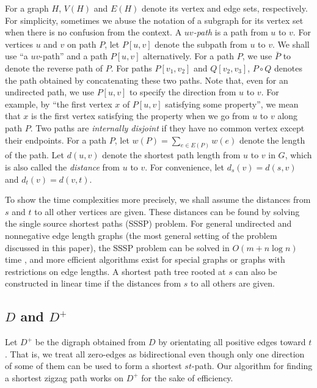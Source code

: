 \documentclass[review]{elsarticle}
\begin{document}
For a graph $H$, $V(H)$ and $E(H)$ denote its vertex and edge sets,
respectively. For simplicity, sometimes we abuse the notation of a
subgraph for its vertex set when there is no confusion from the
context. A {\em $uv$-path} is a path from $u$ to $v$. For vertices
$u$ and $v$ on path $P$, let $P[u,v]$ denote the subpath from $u$ to
$v$. We shall use ``a $uv$-path'' and a path $P[u,v]$ alternatively.
For a path $P$, we use $\bar{P}$ to denote the reverse path of $P$.
For paths $P[v_1,v_2]$ and $Q[v_2,v_3]$, $P\circ Q$ denotes the path
obtained by concatenating these two paths. Note that, even for an
undirected path, we use $P[u,v]$ to specify the direction from $u$
to $v$. For example, by ``the first vertex $x$ of $P[u,v]$
satisfying some property'', we mean that $x$ is the first vertex
satisfying the property when we go from $u$ to $v$ along path $P$.
Two paths are {\em internally disjoint} if they have no common
vertex except their endpoints. For a path $P$, let $w(P)=\sum_{e\in
E(P)}w(e)$ denote the length of the path. Let $d(u,v)$ denote the
shortest path length from $u$ to $v$ in $G$, which is also called
the {\em distance} from $u$ to $v$. For convenience, let
$d_s(v)=d(s,v)$ and $d_t(v)=d(v,t)$.


To show the time complexities more precisely, we shall assume the
distances from $s$ and $t$ to all other vertices are given. These
distances can be found by solving the single source shortest paths
(SSSP) problem. For general undirected and nonnegative edge length
graphs (the most general setting of the problem discussed in this
paper), the SSSP problem can be solved in $O(m+n\log n)$ time
\cite{cor01,fred87}, and more efficient algorithms exist for special
graphs or graphs with restrictions on edge lengths. A shortest path
tree rooted at $s$ can also be constructed in linear time if the
distances from $s$ to all others are given.

\subsection{$D$ and $D^+$}

Let $D^+$ be the digraph obtained from $D$ by orientating all
positive edges toward $t$. That is, we treat all zero-edges as
bidirectional even though only one direction of some of them can be
used to form a shortest $st$-path. Our algorithm for finding a
shortest zigzag path works on $D^+$ for the sake of efficiency.
\end{document}
